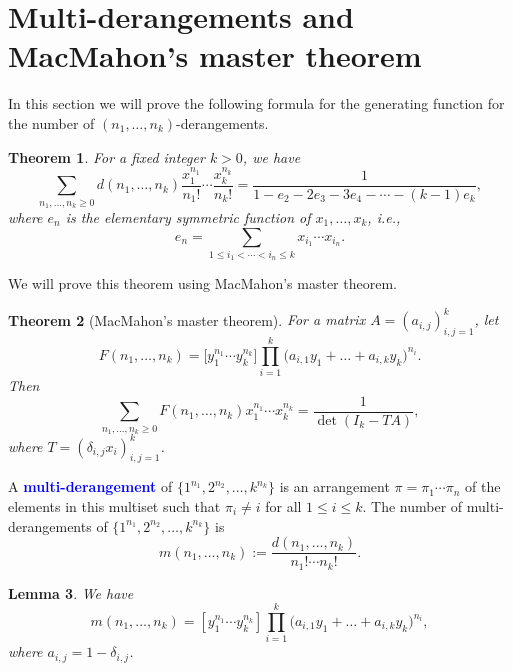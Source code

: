 \documentclass[oneside]{book}
\numberwithin{equation}{section}
\newtheorem{thm}{Theorem}[section]
\newtheorem{lem}[thm]{Lemma}
\theoremstyle{definition}
\renewcommand\emph[1]{\textcolor{blue}{\bf #1}}
\begin{document}
\section{Multi-derangements and MacMahon's master theorem}
\label{sec:enumeration}

In this section we will prove the following formula for the generating
function for the number of \( (n_1,\dots,n_k) \)-derangements.

\begin{thm}\label{thm:21}
For a fixed integer \( k>0 \), we have
  \[
    \sum_{n_1,\dots,n_k\geq0} d(n_1,\dots,n_k)
    \frac{x_1^{n_1}}{n_1!} \cdots \frac{x_k^{n_k}}{n_k!} =
    \frac{1}{1-e_2-2e_3-3e_4-\cdots-(k-1)e_k},
\]
where
$e_n$ is the elementary symmetric function of $x_1,\dots,x_k$, i.e.,
\[
e_n = \sum_{1\leq i_1<\cdots<i_n\leq k} x_{i_1}\cdots x_{i_n}.
\]
\end{thm}

We will prove this theorem using MacMahon's master theorem.

\begin{thm}[MacMahon's master theorem]
  \label{thm:MMT}
  For a matrix \( A = (a_{i,j})_{i,j=1}^k \), let
\[
  F(n_1,\dots,n_k)  =  \bigl[y_1^{n_1}\cdots y_k^{n_k}\bigr] 
\prod_{i=1}^k \bigl(a_{i,1}y_1 + \dots + a_{i,k}y_k \bigl)^{n_i}.
\]
Then
\[
  \sum _{n_{1},\dots ,n_{k}\ge 0}F(n_{1},\dots ,n_{k})x_{1}^{n_{1}}\cdots x_{k}^{n_{k}}
  ={\frac {1}{\det(I_{k}-TA)}},
\]
where \( T = (\delta_{i,j}x_i)_{i,j=1}^k \).
\end{thm}


A \emph{multi-derangement} of \(\{1^{n_1}, 2^{n_2},\dots,k^{n_k}\}\) is
an arrangement \( \pi=\pi_1 \cdots \pi_n \) of the elements in this
multiset such that \( \pi_i\ne i \) for all \( 1\le i\le k \).
The number of multi-derangements of \(\{1^{n_1}, 2^{n_2},\dots,k^{n_k}\}\)
is
\[
  m(n_1,\dots,n_k) := \frac{ d(n_1,\dots,n_k)}{n_1! \cdots n_k!}.
\]


\begin{lem}\label{lem:13}
  We have
  \[
      m(n_1,\dots,n_k)  = \left[y_1^{n_1}\cdots y_k^{n_k}\right] 
\prod_{i=1}^k \bigl(a_{i,1}y_1 + \dots + a_{i,k}y_k \bigl)^{n_i},
  \]
  where  \( a_{i,j}=1-\delta_{i,j} \). 
\end{lem}
\end{document}
